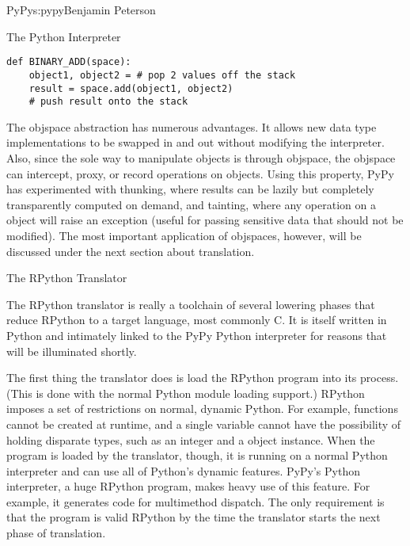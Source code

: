 \begin{aosachapter}{PyPy}{s:pypy}{Benjamin Peterson}
\begin{aosasect1}{The Python Interpreter}
\begin{verbatim}
def BINARY_ADD(space):
    object1, object2 = # pop 2 values off the stack
    result = space.add(object1, object2)
    # push result onto the stack
\end{verbatim}

The objspace abstraction has numerous advantages. It allows new data type
implementations to be swapped in and out without modifying the
interpreter. Also, since the sole way to manipulate objects is through objspace,
the objspace can intercept, proxy, or record operations on objects. Using this
property, PyPy has experimented with thunking, where results can be lazily but
completely transparently computed on demand, and tainting, where any operation
on a object will raise an exception (useful for passing sensitive data that
should not be modified). The most important application of objspaces, however,
will be discussed under the next section about translation.

\end{aosasect1}

\begin{aosasect1}{The RPython Translator}

The RPython translator is really a toolchain of several lowering phases that
reduce RPython to a target language, most commonly C. It is itself written in
Python and intimately linked to the PyPy Python interpreter for reasons that
will be illuminated shortly.

The first thing the translator does is load the RPython program into its
process. (This is done with the normal Python module loading support.) RPython
imposes a set of restrictions on normal, dynamic Python. For example, functions
cannot be created at runtime, and a single variable cannot have the possibility
of holding disparate types, such as an integer and a object instance. When the
program is loaded by the translator, though, it is running on a normal Python
interpreter and can use all of Python's dynamic features. PyPy's Python
interpreter, a huge RPython program, makes heavy use of this feature. For
example, it generates code for multimethod dispatch. The only requirement is
that the program is valid RPython by the time the translator starts the next
phase of translation.


\end{aosasect1}
\end{aosachapter}
